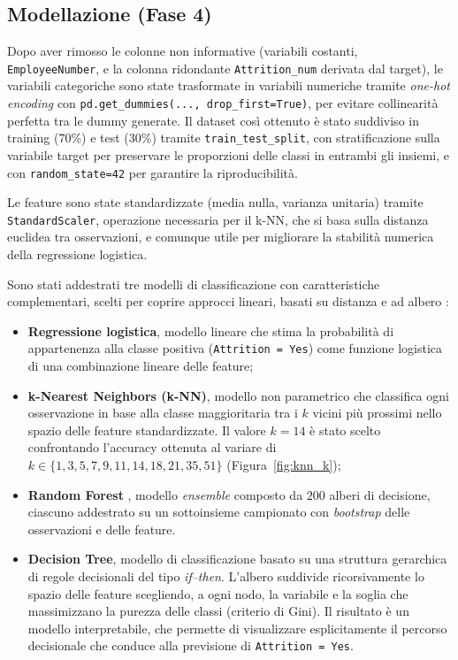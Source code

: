 \documentclass[9pt,a4paper,twocolumn,twoside]{tau-class/tau}
\begin{document}
\subsection{Modellazione (Fase 4)}
Dopo aver rimosso le colonne non informative (variabili costanti, \texttt{EmployeeNumber}, e la colonna ridondante \texttt{Attrition\_num} derivata dal target), le variabili categoriche sono state trasformate in variabili numeriche tramite \emph{one-hot encoding} con \texttt{pd.get\_dummies(..., drop\_first=True)}, per evitare collinearità perfetta tra le dummy generate. Il dataset così ottenuto è stato suddiviso in training (70\%) e test (30\%) tramite \texttt{train\_test\_split}, con stratificazione sulla variabile target per preservare le proporzioni delle classi in entrambi gli insiemi, e con \texttt{random\_state=42} per garantire la riproducibilità.

Le feature sono state standardizzate (media nulla, varianza unitaria) tramite \texttt{StandardScaler}, operazione necessaria per il k-NN, che si basa sulla distanza euclidea tra osservazioni, e comunque utile per migliorare la stabilità numerica della regressione logistica.

Sono stati addestrati tre modelli di classificazione con caratteristiche complementari, scelti per coprire approcci lineari, basati su distanza e ad albero \cite{hastie2009elements}:

\begin{itemize}
    \item \textbf{Regressione logistica}, modello lineare che stima la probabilità di appartenenza alla classe positiva (\texttt{Attrition = Yes}) come funzione logistica di una combinazione lineare delle feature;
    \item \textbf{k-Nearest Neighbors (k-NN)}, modello non parametrico che classifica ogni osservazione in base alla classe maggioritaria tra i $k$ vicini più prossimi nello spazio delle feature standardizzate. Il valore $k=14$ è stato scelto confrontando l'accuracy ottenuta al variare di $k\in \{1,3,5,7,9,11,14,18,21,35,51\}$ (Figura~\ref{fig:knn_k});
    \item \textbf{Random Forest} \cite{breiman2001random}, modello
    \emph{ensemble} composto da $200$ alberi di decisione, ciascuno
    addestrato su un sottoinsieme campionato con \emph{bootstrap} delle osservazioni e delle feature.
    \item \textbf{Decision Tree}, modello di classificazione basato su una struttura gerarchica di regole decisionali del tipo \emph{if--then}. 
      L’albero suddivide ricorsivamente lo spazio delle feature scegliendo, a ogni nodo, la variabile e la soglia che massimizzano la purezza delle classi (criterio di Gini). 
      Il risultato è un modello interpretabile, che permette di visualizzare esplicitamente il percorso decisionale che conduce alla previsione di \texttt{Attrition = Yes}.

\end{itemize}
\end{document}
